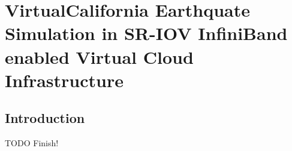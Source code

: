 
\chapter{VirtualCalifornia Earthquate Simulation in SR-IOV InfiniBand enabled Virtual Cloud Infrastructure}
\label{chap:earthquate}

\section{Introduction}

TODO Finish!
